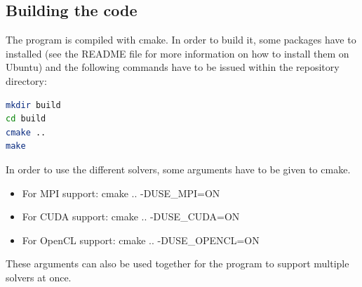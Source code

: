 \documentclass{article}%
\begin{document}
\subsection{Building the code}
The program is compiled with cmake. In order to build it, some packages have to installed (see the README file for more information on how to install them on Ubuntu) and the following commands have to be issued within the repository directory:
\begin{lstlisting}[language=bash,frame=single]
mkdir build
cd build
cmake ..
make
\end{lstlisting}

In order to use the different solvers, some arguments have to be given to cmake.
\begin{itemize}
\item For MPI support: cmake .. -DUSE\_MPI=ON
\item For CUDA support: cmake .. -DUSE\_CUDA=ON
\item For OpenCL support: cmake .. -DUSE\_OPENCL=ON
\end{itemize}
These arguments can also be used together for the program to support multiple solvers at once.
\end{document}
